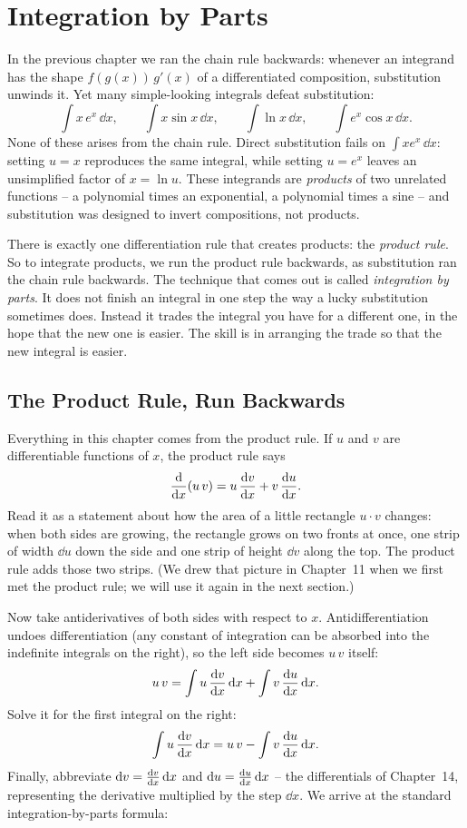 \chapter{Integration by Parts}

In the previous chapter we ran the chain rule backwards: whenever an integrand has
the shape $f(g(x))\,g'(x)$ of a differentiated composition, substitution unwinds it.
Yet many simple-looking integrals defeat substitution:
\[
\int x\,e^{x}\,\dd x, \qquad \int x\sin x\,\dd x, \qquad \int \ln x\,\dd x, \qquad
\int e^{x}\cos x\,\dd x.
\]
None of these arises from the chain rule. Direct substitution fails on
$\int x e^{x}\,\dd x$: setting $u=x$ reproduces the same integral, while
setting $u=e^{x}$ leaves an unsimplified factor of $x = \ln u$. These
integrands are \emph{products} of two unrelated functions -- a polynomial times an
exponential, a polynomial times a sine -- and substitution was designed to invert
compositions, not products.

There is exactly one differentiation rule that creates products: the
\emph{product rule}. So to integrate products, we run the product rule
backwards, as substitution ran the chain rule backwards. The technique that
comes out is called \emph{integration by parts}.
It does not finish an integral in one step the way a lucky substitution
sometimes does. Instead it trades the integral you have for a different one,
in the hope that the new one is easier. The skill is in arranging the
trade so that the new integral is easier.

\chapterline

\section{The Product Rule, Run Backwards}
\label{ch23:product-backwards}

Everything in this chapter comes from the product rule. If $u$
and $v$ are differentiable functions of $x$, the product rule says
\[
\frac{\mathrm{d}}{\mathrm{d} x}\!\left(u\,v\right) = u\,\frac{\mathrm{d} v}{\mathrm{d} x} + v\,\frac{\mathrm{d} u}{\mathrm{d} x}.
\]
Read it as a statement about how the area of a little rectangle $u\cdot v$
changes: when both sides are growing, the rectangle grows on two fronts at once,
one strip of width $\dd u$ down the side and one strip of height $\dd v$ along
the top. The product rule adds those two strips. (We drew that picture in
Chapter~11 when we first met the product rule; we will use it again in the next
section.)

Now take antiderivatives of both sides with respect to $x$. Antidifferentiation
undoes differentiation (any constant of integration can be absorbed into the
indefinite integrals on the right), so the left side becomes $u\,v$ itself:
\[
u\,v = \int u\,\frac{\mathrm{d} v}{\mathrm{d} x}\,\mathrm{d} x + \int v\,\frac{\mathrm{d} u}{\mathrm{d} x}\,\mathrm{d} x.
\]
Solve it for the first integral on the right:
\[
\int u\,\frac{\mathrm{d} v}{\mathrm{d} x}\,\mathrm{d} x = u\,v - \int v\,\frac{\mathrm{d} u}{\mathrm{d} x}\,\mathrm{d} x.
\]
Finally, abbreviate $\mathrm{d} v = \frac{\mathrm{d} v}{\mathrm{d} x}\,\mathrm{d} x$ and $\mathrm{d} u = \frac{\mathrm{d} u}{\mathrm{d} x}\,\mathrm{d} x$ --
the differentials of Chapter~14, representing the derivative multiplied by the
step $\dd x$. We arrive at the standard integration-by-parts formula:

